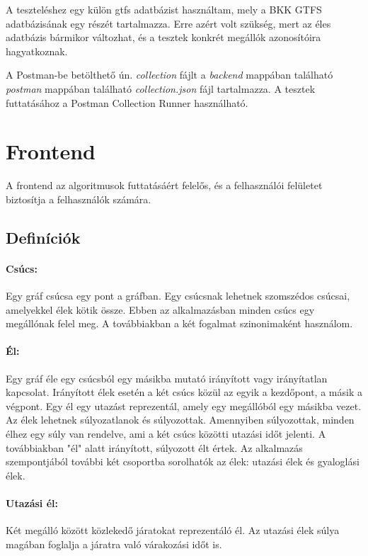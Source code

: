 A teszteléshez egy külön gtfs adatbázist használtam, mely a BKK GTFS adatbázisának egy részét tartalmazza. Erre azért volt szükség, mert az éles adatbázis bármikor változhat, és a tesztek konkrét megállók azonosítóira hagyatkoznak.

A Postman-be betölthető ún. \textit{collection} fájlt a \textit{backend} mappában található \textit{postman} mappában található \textit{collection.json} fájl tartalmazza. A tesztek futtatásához a Postman Collection Runner használható.

\section{Frontend}

A frontend az algoritmusok futtatásáért felelős, és a felhasználói felületet biztosítja a felhasználók számára.

\subsection{Definíciók}

\paragraph{Csúcs:} Egy gráf csúcsa egy pont a gráfban. Egy csúcsnak lehetnek szomszédos csúcsai, amelyekkel élek kötik össze. Ebben az alkalmazásban minden csúcs egy megállónak felel meg. A továbbiakban a két fogalmat szinonimaként használom.

\paragraph{Él:} Egy gráf éle egy csúcsból egy másikba mutató irányított vagy irányítatlan kapcsolat. Irányított élek esetén a két csúcs közül az egyik a kezdőpont, a másik a végpont. Egy él egy utazást reprezentál, amely egy megállóból egy másikba vezet. Az élek lehetnek súlyozatlanok és súlyozottak. Amennyiben súlyozottak, minden élhez egy súly van rendelve, ami a két csúcs közötti utazási időt jelenti. A továbbiakban "él" alatt irányított, súlyozott élt értek. Az alkalmazás szempontjából további két csoportba sorolhatók az élek: utazási élek és gyaloglási élek.

\paragraph{Utazási él:} Két megálló között közlekedő járatokat reprezentáló él. Az utazási élek súlya magában foglalja a járatra való várakozási időt is.

